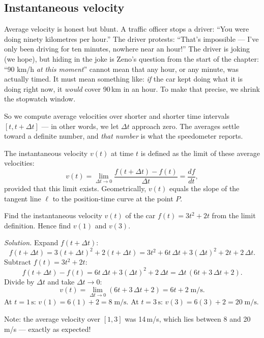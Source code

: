 \subsection{Instantaneous velocity}

Average velocity is honest but blunt. A traffic officer stops a driver:
``You were doing ninety kilometres per hour.'' The driver protests: ``That's
impossible --- I've only been driving for ten minutes, nowhere near an hour!''
The driver is joking (we hope), but hiding in the joke is Zeno's question
from the start of the chapter: ``90 km/h \emph{at this moment}'' cannot mean
that any hour, or any minute, was actually timed. It must mean something
like: \emph{if} the car kept doing what it is doing right now, it \emph{would}
cover 90\,km in an hour. To make that precise, we shrink the stopwatch
window.

So we compute average velocities over shorter and shorter time intervals
$[t,t+\Delta t]$ --- in other words, we let $\Delta t$ approach zero. The
averages settle toward a definite number, and \emph{that number} is what the
speedometer reports.

\begin{keybox}
The instantaneous velocity $v(t)$ at time $t$ is defined as the limit of these average velocities:
\[
  v(t) = \lim_{\Delta t\to 0}\frac{f(t+\Delta t)-f(t)}{\Delta t} = \frac{df}{dt},
\]
provided that this limit exists. Geometrically, $v(t)$ equals the slope of the tangent line
$\ell$ to the position-time curve at the point $P$.
\end{keybox}

\begin{workedexample}
Find the instantaneous velocity $v(t)$ of the car $f(t)=3t^2+2t$ from the limit definition.
Hence find $v(1)$ and $v(3)$.

\medskip\textit{Solution.} Expand $f(t+\Delta t)$:
\[
  f(t+\Delta t)=3(t+\Delta t)^2+2(t+\Delta t)=3t^2+6t\,\Delta t+3(\Delta t)^2+2t+2\,\Delta t.
\]
Subtract $f(t)=3t^2+2t$:
\[
  f(t+\Delta t)-f(t) = 6t\,\Delta t+3(\Delta t)^2+2\,\Delta t = \Delta t\,(6t+3\,\Delta t+2).
\]
Divide by $\Delta t$ and take $\Delta t\to 0$:
\[
  v(t) = \lim_{\Delta t\to 0}(6t+3\,\Delta t+2) = 6t+2\;\text{m/s}.
\]
At $t=1\,\text{s}$: $v(1)=6(1)+2=8\;\text{m/s}$. At $t=3\,\text{s}$: $v(3)=6(3)+2=20\;\text{m/s}$.

Note: the average velocity over $[1,3]$ was 14\,m/s, which lies between 8 and 20\,m/s --- exactly as expected!
\end{workedexample}

